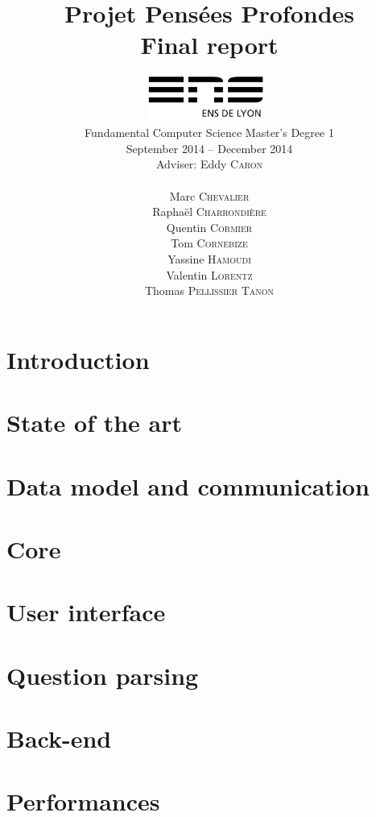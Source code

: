 \documentclass[a4paper,10pt]{report}
\title{Projet Pensées Profondes\\\large Final report}
\author{\includegraphics[width=0.3\textwidth]{../logo_ensl.pdf}\\[50pt]
Fundamental Computer Science Master's Degree 1\\September 2014 \--- December 2014\\[50pt]
Adviser: Eddy \textsc{Caron}\\[50pt]
\begin{minipage}{0.4\textwidth}
    \begin{flushleft} \large
        Marc \textsc{Chevalier}
        \\
        Raphaël \textsc{Charrondière}
        \\
        Quentin \textsc{Cormier}
        \\
        Tom \textsc{Cornebize}
    \end{flushleft}
\end{minipage}
\begin{minipage}{0.4\textwidth}
    \begin{flushright} \large
        Yassine \textsc{Hamoudi}
        \\
        Valentin \textsc{Lorentz}
        \\
        Thomas \textsc{Pellissier Tanon}
        \\
    \end{flushright}
\end{minipage}
}
\date{}
\begin{document}
\maketitle

\tableofcontents

\chapter*{Introduction}
    \label{introduction}
    

\chapter{State of the art}
    \label{stateofart}
    

\chapter{Data model and communication}
    \label{datamodel}
    

\chapter{Core}
    \label{core}
    

\chapter{User interface}
    \label{UI}
    

\chapter{Question parsing}
    \label{questionparsing}
    
    \label{grammatical}
    
    \label{reformulation}
    
    \label{standalone}
    

\chapter{Back-end}
    \label{wikidata}
    
    \label{cas}
    
    \label{spellchecker}
    
    \label{oeis}
    

\chapter{Performances}
    \label{performances}
    
\end{document}
